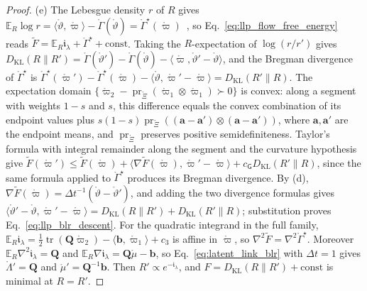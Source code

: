 \begin{proof}
(e) The Lebesgue density $r$ of $R$ gives $\mathbb E_R\log r=\langle\mathring\vartheta,\mathring\varpi\rangle-\mathring\Gamma(\mathring\vartheta)=\mathring\Gamma^\star(\mathring\varpi)$~\cite{Rockafellar1970}, so Eq.~\eqref{eq:llp_flow_free_energy} reads $\widetilde F=\mathbb E_R\mathfrak i_\lambda+\mathring\Gamma^\star+\mathrm{const}$. Taking the $R$-expectation of $\log(r/r')$ gives $D_{\mathrm{KL}}(R\|R')=\mathring\Gamma(\mathring\vartheta')-\mathring\Gamma(\mathring\vartheta)-\langle\mathring\varpi,\mathring\vartheta'-\mathring\vartheta\rangle$, and the Bregman divergence of $\mathring\Gamma^\star$ is $\mathring\Gamma^\star(\mathring\varpi')-\mathring\Gamma^\star(\mathring\varpi)-\langle\mathring\vartheta,\mathring\varpi'-\mathring\varpi\rangle=D_{\mathrm{KL}}(R'\|R)$. The expectation domain $\{\mathring\varpi_2-\operatorname{pr}_{\mathring\Xi}(\mathring\varpi_1\otimes\mathring\varpi_1)\succ0\}$ is convex: along a segment with weights $1-s$ and $s$, this difference equals the convex combination of its endpoint values plus $s(1-s)\operatorname{pr}_{\mathring\Xi}((\mathbf a-\mathbf a')\otimes(\mathbf a-\mathbf a'))$, where $\mathbf a,\mathbf a'$ are the endpoint means, and $\operatorname{pr}_{\mathring\Xi}$ preserves positive semidefiniteness. Taylor's formula with integral remainder along the segment and the curvature hypothesis give $\widetilde F(\mathring\varpi')\leq\widetilde F(\mathring\varpi)+\langle\nabla\widetilde F(\mathring\varpi),\mathring\varpi'-\mathring\varpi\rangle+c_{\mathsf G}D_{\mathrm{KL}}(R'\|R)$, since the same formula applied to $\mathring\Gamma^\star$ produces its Bregman divergence. By (d), $\nabla\widetilde F(\mathring\varpi)=\Delta t^{-1}(\mathring\vartheta-\mathring\vartheta')$, and adding the two divergence formulas gives $\langle\mathring\vartheta'-\mathring\vartheta,\mathring\varpi'-\mathring\varpi\rangle=D_{\mathrm{KL}}(R\|R')+D_{\mathrm{KL}}(R'\|R)$; substitution proves Eq.~\eqref{eq:llp_blr_descent}. For the quadratic integrand in the full family, $\mathbb E_R\mathfrak i_\lambda=\frac12\operatorname{tr}(\mathbf Q\mathring\varpi_2)-\langle\mathbf b,\mathring\varpi_1\rangle+c_3$ is affine in $\mathring\varpi$, so $\nabla^2\widetilde F=\nabla^2\mathring\Gamma^\star$. Moreover $\mathbb E_R\nabla^2\mathfrak i_\lambda=\mathbf Q$ and $\mathbb E_R\nabla\mathfrak i_\lambda=\mathbf Q\mathring\mu-\mathbf b$, so Eq.~\eqref{eq:latent_link_blr} with $\Delta t=1$ gives $\mathring\Lambda'=\mathbf Q$ and $\mathring\mu'=\mathbf Q^{-1}\mathbf b$. Then $R'\propto e^{-\mathfrak i_\lambda}$, and $F=D_{\mathrm{KL}}(R\|R')+\mathrm{const}$ is minimal at $R=R'$.
\end{proof}

